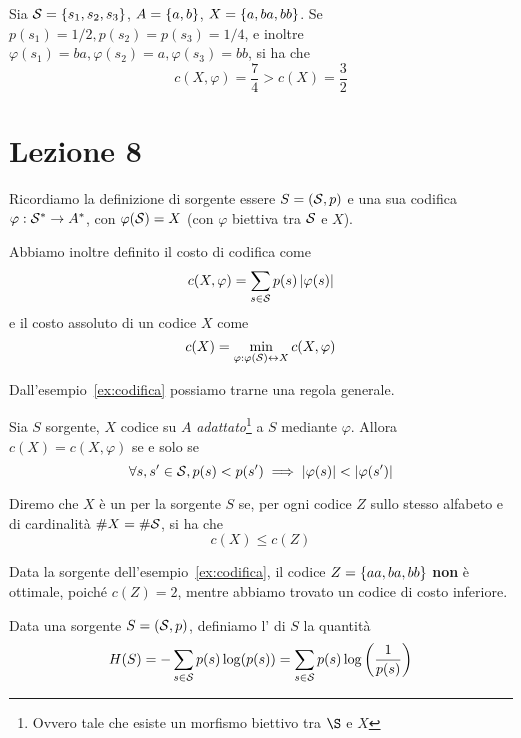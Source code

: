 \begin{example}\label{ex:codifica}
  Sia \(\SCal = \set{s_1,s_2,s_3}\), \(A = \set{a,b}\), \(X = \set{a,ba,bb}\).
  Se \(p(s_1) = 1/2, p(s_2) = p(s_3) = 1/4\), e inoltre \(\varphi(s_1) = ba, \varphi(s_2) = a, \varphi(s_3) = bb\), si ha che
    \[c(X,\varphi) = \frac{7}{4} > c(X) = \frac{3}{2}\]
\end{example}

\chapter{Lezione 8}

Ricordiamo la definizione di sorgente essere \(S = (\mathcal{S}, p)\) e una sua codifica \(\varphi: \mathcal{S}^* \to A^*\),  con \(\varphi(\mathcal{S}) = X\) (con \(\varphi\) biettiva tra \(\mathcal{S}\) e \(X\)).

Abbiamo inoltre definito il costo di codifica come
\[c(X,\varphi) = \sum_{s \in \mathcal{S}} p(s) \left|\varphi(s)\right|\]
e il costo assoluto di un codice \(X\) come
\[c(X) = \min_{\varphi: \varphi(\mathcal{S}) \leftrightarrow X} c(X,\varphi)\]

Dall'esempio~\ref{ex:codifica} possiamo trarne una regola generale.

\begin{proposition}
  Sia \(S\) sorgente, \(X\) codice su \(A\) \emph{adattato}\footnote{Ovvero tale che esiste un morfismo biettivo tra \(\S\) e \(X\)} a \(S\) mediante \(\varphi\).
  Allora \(c(X) = c(X,\varphi)\) se e solo se
    \[\forall s,s' \in \mathcal{S}, p(s) < p(s') \implies \left|\varphi(s)\right| < \left|\varphi(s')\right| \]
\end{proposition}

\begin{definition}
  Diremo che \(X\) è un  per la sorgente \(S\) se, per ogni codice \(Z\) sullo stesso alfabeto e di cardinalità \(\# X = \# \mathcal{S}\), si ha che
  \[c(X) \leq c(Z)\]
\end{definition}

\begin{example}
  Data la sorgente dell'esempio~\ref{ex:codifica}, il codice \(Z = \set{aa,ba,bb}\) \textbf{non} è ottimale, poiché \(c(Z) = 2\), mentre abbiamo trovato un codice di costo inferiore.
\end{example}

\begin{definition}
  Data una sorgente \(S = (\mathcal{S},p)\), definiamo l' di \(S\) la quantità
  \[H(S) = -\sum_{s \in \mathcal{S}} p(s) \log(p(s)) = \sum_{s \in \mathcal{S}} p(s) \log\left(\frac{1}{p(s)}\right)\]  
\end{definition}


